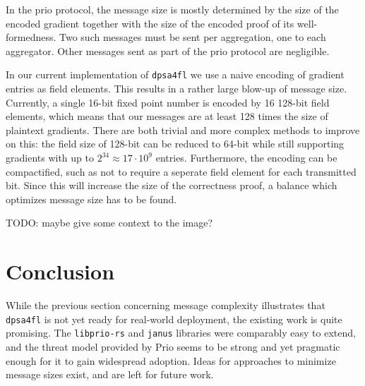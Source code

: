 \documentclass{article}
\begin{document}
In the prio protocol, the message size is mostly determined by the size of the
encoded gradient together with the size of the encoded proof of its
well-formedness. Two such messages must be sent per aggregation, one to each
aggregator. Other messages sent as part of the prio protocol are negligible.

In our current implementation of \texttt{dpsa4fl} we use a naive encoding of
gradient entries as field elements. This results in a rather large blow-up of
message size. Currently, a single 16-bit fixed point number is encoded by 16
128-bit field elements, which means that our messages are at least 128 times
the size of plaintext gradients.
There are both trivial and more complex methods to improve on this: the field
size of 128-bit can be reduced to 64-bit while still supporting gradients with
up to $2^{34} \approx 17 \cdot 10^9$ entries. Furthermore, the encoding can be
compactified, such as not to require a seperate field element for each
transmitted bit. Since this will increase the size of the correctness proof,
a balance which optimizes message size has to be found.


{\color{green}TODO: maybe give some context to the image?}

\section{Conclusion}
While the previous section concerning message complexity
illustrates that \texttt{dpsa4fl} is not yet ready for real-world deployment, the
existing work is quite promising. The \texttt{libprio-rs} and \texttt{janus}
libraries were comparably easy to extend, and the threat model provided by Prio
seems to be strong and yet pragmatic enough for it to gain widespread adoption.
Ideas for approaches to minimize message sizes exist, and are left for future work.



\end{document}
